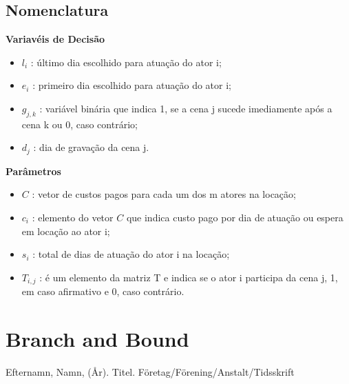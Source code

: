 \documentclass[12pt]{article}
\begin{document}
\subsection{Nomenclatura}
\textbf{Variavéis de Decisão}
\begin{itemize}
  \item $l_i$ : último dia escolhido para atuação do ator i;
  \item $e_i$ : primeiro dia escolhido para atuação do ator i;
  \item $g_{j,k}$ : variável binária que indica 1, se a cena j sucede imediamente após a cena k ou 0, caso contrário;
  \item $d_j$ : dia de gravação da cena j.
\end{itemize}
\newpage
\textbf{Parâmetros}
\begin{itemize}
  \item $C$ : vetor de custos pagos para cada um dos m atores na locação;
  \item $c_i$ : elemento do vetor $C$ que indica custo pago por dia de atuação ou espera em locação ao ator i;
  \item $s_i$ : total de dias de atuação do ator i na locação;
  \item $T_{i,j}$ : é um elemento da matriz T e indica se o ator i participa da cena j, 1, em caso afirmativo e 0, caso contrário.
  
  
\end{itemize}

\newpage
\section{Branch and Bound}


\vfill

\begin{thebibliography}{1}
 Efternamn, Namn, (År). Titel. Företag/Förening/Anstalt/Tidsskrift
\end{thebibliography} 
\newpage
\appendix
\end{document}
